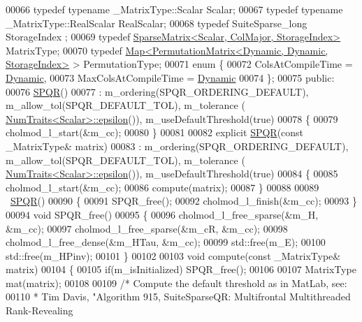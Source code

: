 \begin{DoxyCode}
00066     \textcolor{keyword}{typedef} \textcolor{keyword}{typename} \_MatrixType::Scalar Scalar;
00067     \textcolor{keyword}{typedef} \textcolor{keyword}{typename} \_MatrixType::RealScalar RealScalar;
00068     \textcolor{keyword}{typedef} SuiteSparse\_long StorageIndex ;
00069     \textcolor{keyword}{typedef} \hyperlink{group___sparse_core___module}{SparseMatrix<Scalar, ColMajor, StorageIndex>} 
      MatrixType;
00070     \textcolor{keyword}{typedef} \hyperlink{group___core___module_class_eigen_1_1_map}{Map<PermutationMatrix<Dynamic, Dynamic, StorageIndex>}
       > PermutationType;
00071     \textcolor{keyword}{enum} \{
00072       ColsAtCompileTime = \hyperlink{namespace_eigen_ad81fa7195215a0ce30017dfac309f0b2}{Dynamic},
00073       MaxColsAtCompileTime = \hyperlink{namespace_eigen_ad81fa7195215a0ce30017dfac309f0b2}{Dynamic}
00074     \};
00075   \textcolor{keyword}{public}:
00076     \hyperlink{class_eigen_1_1_s_p_q_r}{SPQR}() 
00077       : m\_ordering(SPQR\_ORDERING\_DEFAULT), m\_allow\_tol(SPQR\_DEFAULT\_TOL), m\_tolerance (
      \hyperlink{group___core___module_struct_eigen_1_1_num_traits}{NumTraits<Scalar>::epsilon}()), m\_useDefaultThreshold(\textcolor{keyword}{true})
00078     \{ 
00079       cholmod\_l\_start(&m\_cc);
00080     \}
00081     
00082     \textcolor{keyword}{explicit} \hyperlink{class_eigen_1_1_s_p_q_r}{SPQR}(\textcolor{keyword}{const} \_MatrixType& matrix)
00083     : m\_ordering(SPQR\_ORDERING\_DEFAULT), m\_allow\_tol(SPQR\_DEFAULT\_TOL), m\_tolerance (
      \hyperlink{group___core___module_struct_eigen_1_1_num_traits}{NumTraits<Scalar>::epsilon}()), m\_useDefaultThreshold(\textcolor{keyword}{true})
00084     \{
00085       cholmod\_l\_start(&m\_cc);
00086       compute(matrix);
00087     \}
00088     
00089     ~\hyperlink{class_eigen_1_1_s_p_q_r}{SPQR}()
00090     \{
00091       SPQR\_free();
00092       cholmod\_l\_finish(&m\_cc);
00093     \}
00094     \textcolor{keywordtype}{void} SPQR\_free()
00095     \{
00096       cholmod\_l\_free\_sparse(&m\_H, &m\_cc);
00097       cholmod\_l\_free\_sparse(&m\_cR, &m\_cc);
00098       cholmod\_l\_free\_dense(&m\_HTau, &m\_cc);
00099       std::free(m\_E);
00100       std::free(m\_HPinv);
00101     \}
00102 
00103     \textcolor{keywordtype}{void} compute(\textcolor{keyword}{const} \_MatrixType& matrix)
00104     \{
00105       \textcolor{keywordflow}{if}(m\_isInitialized) SPQR\_free();
00106 
00107       MatrixType mat(matrix);
00108       
00109       \textcolor{comment}{/* Compute the default threshold as in MatLab, see:}
00110 \textcolor{comment}{       * Tim Davis, "Algorithm 915, SuiteSparseQR: Multifrontal Multithreaded Rank-Revealing}

\end{DoxyCode}
